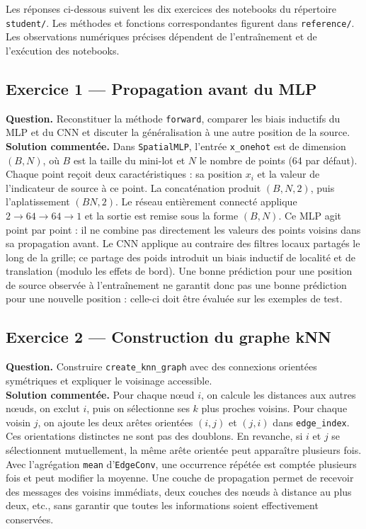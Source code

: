 \documentclass[11pt,a4paper]{article}
\begin{document}
Les réponses ci-dessous suivent les dix exercices des notebooks du répertoire
\texttt{student/}. Les méthodes et fonctions correspondantes figurent dans
\texttt{reference/}. Les observations numériques précises dépendent de
l'entraînement et de l'exécution des notebooks.

\subsection{Exercice 1 --- Propagation avant du MLP}

\textbf{Question.} Reconstituer la méthode \texttt{forward}, comparer les
biais inductifs du MLP et du CNN et discuter la généralisation à une autre
position de la source.
\\

\textbf{Solution commentée.} Dans \texttt{SpatialMLP}, l'entrée
\texttt{x\_onehot} est de dimension $(B,N)$, où $B$ est la taille du
mini-lot et $N$ le nombre de points (64 par défaut). Chaque point reçoit
deux caractéristiques : sa position $x_i$ et la valeur de l'indicateur
de source à ce point. La concaténation produit $(B,N,2)$, puis
l'aplatissement $(BN,2)$. Le réseau entièrement connecté applique
$2\to64\to64\to1$ et la sortie est remise sous la forme $(B,N)$.
Ce MLP agit point par point : il ne combine pas directement les valeurs
des points voisins dans sa propagation avant. Le CNN applique au contraire
des filtres locaux partagés le long de la grille; ce partage des poids
introduit un biais inductif de localité et de translation (modulo les
effets de bord). Une bonne prédiction pour une position de source
observée à l'entraînement ne garantit donc pas une bonne prédiction
pour une nouvelle position : celle-ci doit être évaluée sur les
exemples de test.

\subsection{Exercice 2 --- Construction du graphe kNN}

\textbf{Question.} Construire \texttt{create\_knn\_graph} avec des
connexions orientées symétriques et expliquer le voisinage accessible.
\\

\textbf{Solution commentée.} Pour chaque nœud $i$, on calcule les
distances aux autres nœuds, on exclut $i$, puis on sélectionne ses
$k$ plus proches voisins. Pour chaque voisin $j$, on ajoute les deux
arêtes orientées $(i,j)$ et $(j,i)$ dans \texttt{edge\_index}.
Ces orientations distinctes ne sont pas des doublons. En revanche,
si $i$ et $j$ se sélectionnent mutuellement, la même arête orientée
peut apparaître plusieurs fois. Avec l'agrégation \texttt{mean}
d'\texttt{EdgeConv}, une occurrence répétée est comptée plusieurs
fois et peut modifier la moyenne. Une couche de propagation permet
de recevoir des messages des voisins immédiats, deux couches des
nœuds à distance au plus deux, etc., sans garantir que toutes les
informations soient effectivement conservées.
\end{document}

